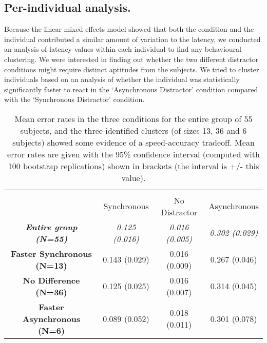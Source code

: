 \subsection*{Per-individual analysis.}

Because the linear mixed effects model showed that both the condition
and the individual contributed a similar amount of variation to the
latency, we conducted an analysis of latency values within each
individual to find any behavioural clustering. We were interested in
finding out whether the two different distractor conditions might
require distinct aptitudes from the subjects. We tried to cluster
individuals based on an analysis of whether the individual was
statistically significantly faster to react in the `Asynchronous
Distractor' condition compared with the `Synchronous Distractor'
condition.

\begin{table}[ht]
\caption{Mean error rates in the three conditions for the entire group
  of 55 subjects, and the three identified clusters (of sizes 13, 36
  and 6 subjects) showed some evidence of a speed-accuracy tradeoff. Mean
  error rates are given with the 95\% confidence interval (computed
  with 100 bootstrap replications) shown in brackets (the interval is
  +/- this value).}  \centering
\begin{tabular}{c c c c}
\hline
\raisebox{-3ex}{\textbf{Group}} & \multicolumn{3}{c}{\raisebox{-1ex}{\textbf{Error rates for conditions}}} \\ [1ex]
 & Synchronous & No Distractor & Asynchronous \\ [1ex]
\hline
\textbf{\emph{Entire group (N=55)}} & \emph{ 0.125 (0.016)} & \emph{0.016 (0.005)} &  \emph{0.302 (0.029)} \\
\textbf{Faster Synchronous (N=13)}  &        0.143 (0.029)  &       0.016 (0.009)  &        0.267 (0.046)  \\
\textbf{No Difference (N=36)}       &        0.125 (0.025)  &       0.016 (0.007)  &        0.314 (0.045)  \\
\textbf{Faster Asynchronous (N=6)} &        0.089 (0.052)  &       0.018 (0.011)  &        0.301 (0.078)  \\ [1ex]
\hline
\end{tabular}
\label{table:clustering}
\end{table}

